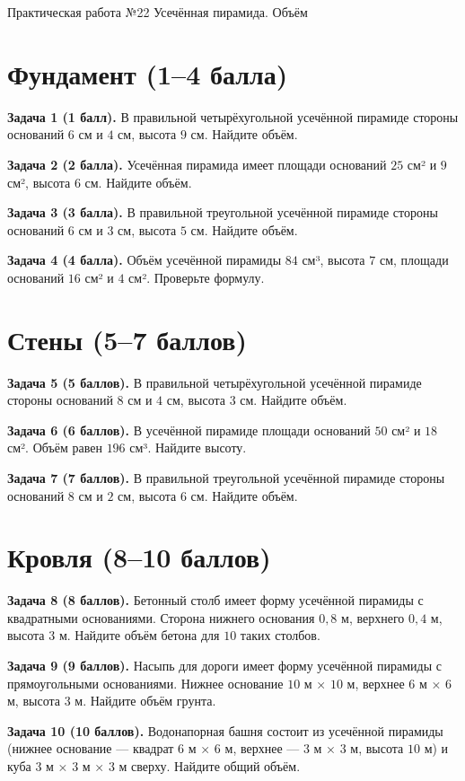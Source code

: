 \documentclass{umk-matematika}
\begin{document}
\maketitlepage
    {Практическая работа №22}
    {Усечённая пирамида. Объём}
    {}

\section{Фундамент (1--4 балла)}

\textbf{Задача 1 (1 балл).} В правильной четырёхугольной усечённой пирамиде стороны оснований $6$ см и $4$ см, высота $9$ см. Найдите объём.

\textbf{Задача 2 (2 балла).} Усечённая пирамида имеет площади оснований $25$ см² и $9$ см², высота $6$ см. Найдите объём.

\textbf{Задача 3 (3 балла).} В правильной треугольной усечённой пирамиде стороны оснований $6$ см и $3$ см, высота $5$ см. Найдите объём.

\textbf{Задача 4 (4 балла).} Объём усечённой пирамиды $84$ см³, высота $7$ см, площади оснований $16$ см² и $4$ см². Проверьте формулу.

\section{Стены (5--7 баллов)}

\textbf{Задача 5 (5 баллов).} В правильной четырёхугольной усечённой пирамиде стороны оснований $8$ см и $4$ см, высота $3$ см. Найдите объём.

\textbf{Задача 6 (6 баллов).} В усечённой пирамиде площади оснований $50$ см² и $18$ см². Объём равен $196$ см³. Найдите высоту.

\textbf{Задача 7 (7 баллов).} В правильной треугольной усечённой пирамиде стороны оснований $8$ см и $2$ см, высота $6$ см. Найдите объём.

\section{Кровля (8--10 баллов)}

\textbf{Задача 8 (8 баллов).} Бетонный столб имеет форму усечённой пирамиды с квадратными основаниями. Сторона нижнего основания $0{,}8$ м, верхнего $0{,}4$ м, высота $3$ м. Найдите объём бетона для $10$ таких столбов.

\textbf{Задача 9 (9 баллов).} Насыпь для дороги имеет форму усечённой пирамиды с прямоугольными основаниями. Нижнее основание $10$ м × $10$ м, верхнее $6$ м × $6$ м, высота $3$ м. Найдите объём грунта.

\textbf{Задача 10 (10 баллов).} Водонапорная башня состоит из усечённой пирамиды (нижнее основание — квадрат $6$ м × $6$ м, верхнее — $3$ м × $3$ м, высота $10$ м) и куба $3$ м × $3$ м × $3$ м сверху. Найдите общий объём.
\end{document}

